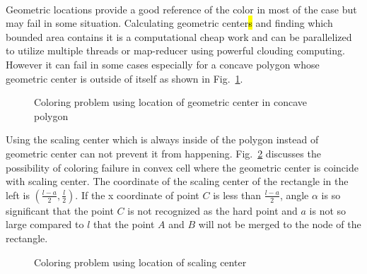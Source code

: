 \paragraph{}
Geometric locations provide a good reference of the color in most of the case but may fail in some situation.
Calculating geometric center\hl{s} and finding which bounded area contains it is a computational cheap work and can be parallelized to utilize multiple threads or map-reducer using powerful clouding computing.
However it can fail in some cases especially for a concave polygon whose geometric center is outside of itself as shown in Fig.~\ref{qdt_fig:qdt_coloring_geo_problem}.
\begin{figure}[h!]
    \centering
    \caption[Coloring problem using location of geometric center in concave polygon]{Coloring problem using location of geometric center in concave polygon}
    \label{qdt_fig:qdt_coloring_geo_problem}
\end{figure}
%
Using the scaling center which is always inside of the polygon instead of geometric center can not prevent it from happening.
Fig.~\ref{qdt_fig:qdt_coloring_geo_problem_sc} discusses the possibility of coloring failure in convex cell where the geometric center is coincide with scaling center.
The coordinate of the scaling center of the rectangle in the left is $(\frac{l-a}{2},\frac{l}{2})$.
If the x coordinate of point $C$ is less than $\frac{l-a}{2}$, angle $\alpha$ is so significant that the point $C$ is not recognized as the hard point and $a$ is not so large compared to $l$ that the point $A$ and $B$ will not be merged to the node of the rectangle.
\begin{figure}[h!]
    \centering
    \caption[Coloring problem using location of scaling center]{Coloring problem using location of scaling center}
    \label{qdt_fig:qdt_coloring_geo_problem_sc}
\end{figure}
